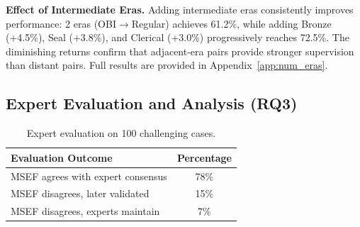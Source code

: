 \documentclass{article}
\begin{document}

\textbf{Effect of Intermediate Eras.}
Adding intermediate eras consistently improves performance: 2 eras (OBI$\to$Regular) achieves 61.2\%, while adding Bronze (+4.5\%), Seal (+3.8\%), and Clerical (+3.0\%) progressively reaches 72.5\%. The diminishing returns confirm that adjacent-era pairs provide stronger supervision than distant pairs. Full results are provided in Appendix~\ref{app:num_eras}.

\subsection{Expert Evaluation and Analysis (RQ3)}


\begin{table} %
\vspace{-1.2em} %
\centering
\small
\caption{Expert evaluation on 100 challenging cases.}
\label{tab:expert_eval}
\begin{tabular}{lc}
\toprule
\textbf{Evaluation Outcome} & \textbf{Percentage} \\
\midrule
MSEF agrees with expert consensus & 78\% \\
MSEF disagrees, later validated & 15\% \\
MSEF disagrees, experts maintain & 7\% \\
\bottomrule
\end{tabular}
\vspace{-2em}
\end{table}


\end{document}

